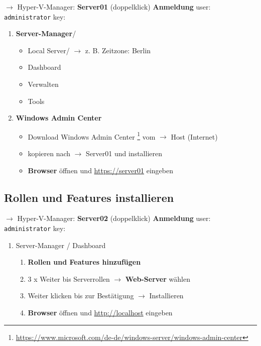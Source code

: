 $\to$ Hyper-V-Manager: \textbf{Server01} (doppelklick)
\textbf{Anmeldung} user: \verb|administrator| key:

\begin{enumerate}
\item
  \textbf{Server-Manager}/

  \begin{itemize}
  \item
    Local Server/ $\to$ z. B. Zeitzone: Berlin
  \item
    Dashboard
  \item
    Verwalten
  \item
    Tools
  \end{itemize}
\item
  \textbf{Windows Admin Center}

  \begin{itemize}
  \item
    Download Windows Admin Center \footnote{\url{https://www.microsoft.com/de-de/windows-server/windows-admin-center}}
    vom $\to$ Host (Internet)
  \item
    kopieren nach $\to$ Server01 und installieren
  \item
    \textbf{Browser} öffnen und \url{https://server01} eingeben
  \end{itemize}
\end{enumerate}

\subsection{Rollen und Features
installieren}\label{rollen-und-features-installieren}

$\to$ Hyper-V-Manager: \textbf{Server02} (doppelklick)
\textbf{Anmeldung} user: \verb|administrator| key:

\begin{enumerate}
\item
  Server-Manager / Dashboard

  \begin{enumerate}
  \def\labelenumii{\arabic{enumii}.}
  \item
    \textbf{Rollen und Features hinzufügen}
  \item
    3 x Weiter bis Serverrollen $\to$ \textbf{Web-Server} wählen
  \item
    Weiter klicken bis zur Bestätigung $\to$ Installieren
  \item
    \textbf{Browser} öffnen und \url{http://localhost} eingeben
  \end{enumerate}
\end{enumerate}

